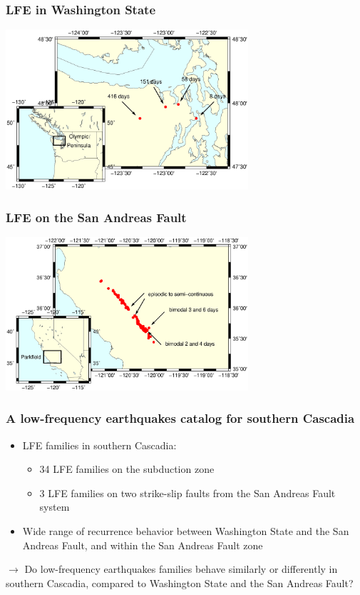 \documentclass{beamer}
\begin{document}
	\begin{frame}
		\frametitle{LFE in Washington State}
		\begin{center}
			\includegraphics[trim={1cm 3cm 1cm 14cm}, clip, width=9cm]{LFE_catalogs/cascadia.eps}
		\end{center}
	\end{frame}

	\begin{frame}
		\frametitle{LFE on the San Andreas Fault}
		\begin{center}
			\includegraphics[trim={1cm 3cm 1cm 14cm}, clip, width=9cm]{LFE_catalogs/sanandreas.eps}
		\end{center}
	\end{frame}

	\begin{frame}
		\frametitle{A low-frequency earthquakes catalog for southern Cascadia}
		\begin{itemize}
			\item LFE families in southern Cascadia:
			\begin{itemize}
				\item 34 LFE families on the subduction zone
				\item 3 LFE families on two strike-slip faults from the San Andreas Fault system
			\end{itemize}
			\item Wide range of recurrence behavior between Washington State and the San Andreas Fault, and within the San Andreas Fault zone
		\end{itemize}
		
		\begin{block}{}
			$\rightarrow$ Do low-frequency earthquakes families behave similarly or differently in southern Cascadia, compared to Washington State and the San Andreas Fault?
		\end{block}
	\end{frame}
\end{document}
